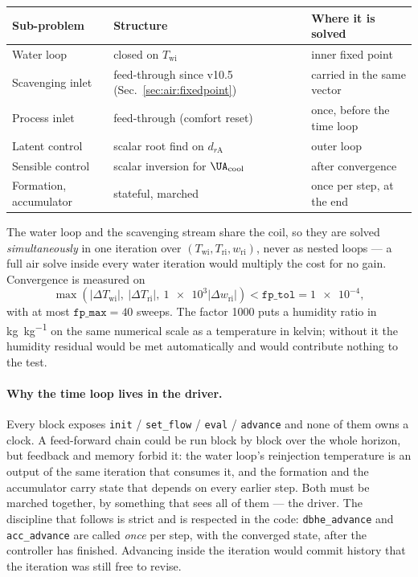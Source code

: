 \begin{center}
\begin{tabular}{@{}lll@{}}
\toprule
Sub-problem & Structure & Where it is solved \\
\midrule
Water loop            & closed on $T_{\mathrm{wi}}$      & inner fixed point \\
Scavenging inlet      & feed-through since v10.5 (Sec.~\ref{sec:air:fixedpoint}) & carried in the same vector \\
Process inlet         & feed-through (comfort reset)     & once, before the time loop \\
Latent control        & scalar root find on $d_{r\mathrm{A}}$ & outer loop \\
Sensible control      & scalar inversion for $\UA_{\mathrm{cool}}$ & after convergence \\
Formation, accumulator& stateful, marched                & once per step, at the end \\
\bottomrule
\end{tabular}
\end{center}

The water loop and the scavenging stream share the coil, so they are solved
\emph{simultaneously} in one iteration over
$(T_{\mathrm{wi}},T_{\mathrm{ri}},w_{\mathrm{ri}})$, never as nested loops ---
a full air solve inside every water iteration would multiply the cost for no
gain. Convergence is measured on
\begin{equation}
\max\left(\left|\Delta T_{\mathrm{wi}}\right|,\
          \left|\Delta T_{\mathrm{ri}}\right|,\
          \num{1e3}\left|\Delta w_{\mathrm{ri}}\right|\right)
< \texttt{fp\_tol} = \num{1e-4},
\label{eq:air:resid}
\end{equation}
with at most $\texttt{fp\_max}=\num{40}$ sweeps. The factor \num{1000} puts a
humidity ratio in \si{\kilogram\per\kilogram} on the same numerical scale as a
temperature in kelvin; without it the humidity residual would be met
automatically and would contribute nothing to the test.

\paragraph{Why the time loop lives in the driver.} Every block exposes
\texttt{init} / \texttt{set\_flow} / \texttt{eval} / \texttt{advance} and none
of them owns a clock. A feed-forward chain could be run block by block over the
whole horizon, but feedback and memory forbid it: the water loop's reinjection
temperature is an output of the same iteration that consumes it, and the
formation and the accumulator carry state that depends on every earlier step.
Both must be marched together, by something that sees all of them --- the
driver. The discipline that follows is strict and is respected in the code:
\texttt{dbhe\_advance} and \texttt{acc\_advance} are called \emph{once} per
step, with the converged state, after the controller has finished. Advancing
inside the iteration would commit history that the iteration was still free to
revise.

